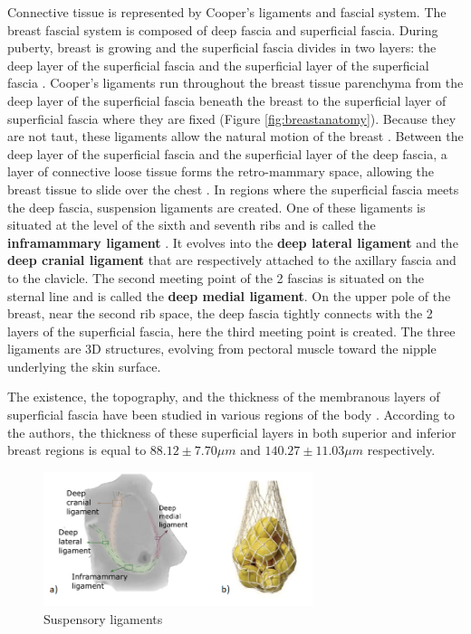Connective tissue is represented by Cooper's ligaments and fascial system. The breast fascial system is composed of deep fascia and superficial fascia. During puberty, breast is growing and the superficial fascia divides in two layers: the deep layer of the superficial fascia and the superficial layer of the superficial fascia \citep{kopans2007breast}.  Cooper's ligaments run throughout the breast tissue parenchyma from the deep layer of the superficial fascia beneath the breast to the superficial layer of superficial fascia where they are fixed (Figure \ref{fig:breastanatomy}). Because they are not taut, these ligaments allow the natural motion of the breast \citep{clemente2011anatomy}. Between the deep layer of the superficial fascia and the superficial layer of the deep fascia, a layer of connective loose tissue forms the retro-mammary space, allowing the breast tissue to slide over the chest \citep{mugea2014aesthetic}. In regions where the superficial fascia meets the deep fascia, suspension ligaments are created. One of these ligaments is situated at the level of the sixth and seventh ribs and is called the \textbf{inframammary ligament} \citep{bayati_inframammary_1995}. It evolves into the \textbf{deep lateral ligament} and the \textbf{deep cranial ligament} that are respectively attached to the axillary fascia and to the clavicle. The second meeting point of the 2 fascias is situated on the sternal line and is called the \textbf{deep medial ligament}. On the upper pole of the breast, near the second rib space, the deep fascia tightly connects with the 2 layers of the superficial fascia, here the third meeting point is created. The three ligaments are 3D structures, evolving from pectoral muscle toward the nipple underlying the skin surface.


The existence, the topography, and the thickness of the membranous layers of superficial fascia have been studied in various regions of the body \citep{abu_membranous_2006}. According to the authors, the thickness of these superficial layers in both superior and inferior breast regions is equal to $88.12 \pm 7.70 \mu m$ and $140.27 \pm 11.03 \mu m$ respectively.

\begin{figure}[!h]
\centering
\centerline{\includegraphics[width=0.7\textwidth,keepaspectratio]{figures/breastLigaments2.png} }
\caption{Suspensory ligaments}
\label{fig:suspensoryligaments}
\end{figure}



